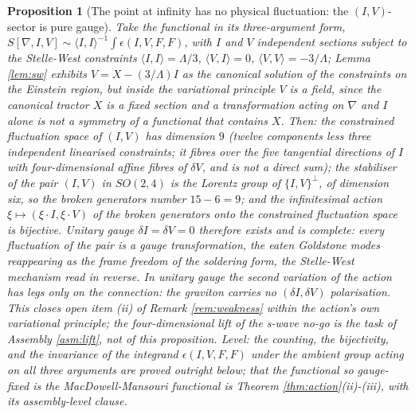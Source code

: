 \documentclass[11pt]{article}
\newtheorem{proposition}[theorem]{Proposition}
\theoremstyle{definition}
\newcommand{\ip}[2]{\langle #1, #2\rangle}
\begin{document}
\begin{proposition}[The point at infinity has no physical fluctuation: the $(I,V)$-sector is pure gauge]\label{prop:goldstone}
Take the functional in its three-argument form, $S[\nabla, I, V] \sim \ip{I}{I}^{-1}\int\epsilon(I, V, F, F)$, with $I$ and $V$ independent sections subject to the Stelle-West constraints $\ip{I}{I} = \Lambda/3$, $\ip{V}{I} = 0$, $\ip{V}{V} = -3/\Lambda$; Lemma \ref{lem:sw} exhibits $V = X - (3/\Lambda)I$ as the canonical solution of the constraints on the Einstein region, but inside the variational principle $V$ is a field, since the canonical tractor $X$ is a fixed section and a transformation acting on $\nabla$ and $I$ alone is not a symmetry of a functional that contains $X$. Then: the constrained fluctuation space of $(I, V)$ has dimension $9$ (twelve components less three independent linearised constraints; it fibres over the five tangential directions of $I$ with four-dimensional affine fibres of $\delta V$, and is not a direct sum); the stabiliser of the pair $(I, V)$ in $SO(2,4)$ is the Lorentz group of $\{I,V\}^\perp$, of dimension six, so the broken generators number $15 - 6 = 9$; and the infinitesimal action $\xi \mapsto (\xi\cdot I, \xi\cdot V)$ of the broken generators onto the constrained fluctuation space is bijective. Unitary gauge $\delta I = \delta V = 0$ therefore exists and is complete: every fluctuation of the pair is a gauge transformation, the eaten Goldstone modes reappearing as the frame freedom of the soldering form, the Stelle-West mechanism read in reverse. In unitary gauge the second variation of the action has legs only on the connection: the graviton carries no $(\delta I, \delta V)$ polarisation. This closes open item (ii) of Remark \ref{rem:weakness} within the action's own variational principle; the four-dimensional lift of the s-wave no-go is the task of Assembly \ref{asm:lift}, not of this proposition. \emph{Level:} the counting, the bijectivity, and the invariance of the integrand $\epsilon(I,V,F,F)$ under the ambient group acting on all three arguments are proved outright below; that the functional so gauge-fixed is the MacDowell-Mansouri functional is Theorem \ref{thm:action}(ii)-(iii), with its assembly-level clause.
\end{proposition}
\end{document}
